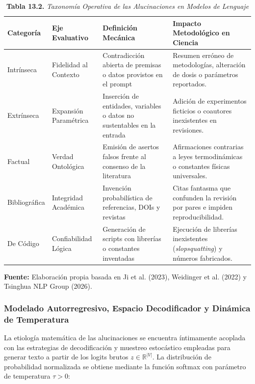 \begin{table}[htpb!]
\centering
\small
\renewcommand{\arraystretch}{1.4}
\begin{tcolorbox}[colback=white, colframe=unmsm_gold, arc=3pt, boxrule=0.8pt, top=0.2cm, bottom=0.2cm, left=0.3cm, right=0.3cm]
\caption*{\textbf{Tabla 13.2.} \textit{Taxonomía Operativa de las Alucinaciones en Modelos de Lenguaje}}
\begin{tabularx}{\textwidth}{l p{2.8cm} p{4.2cm} X}
\toprule
\textbf{Categoría} & \textbf{Eje Evaluativo} & \textbf{Definición Mecánica} & \textbf{Impacto Metodológico en Ciencia} \\
\midrule
Intrínseca & Fidelidad al Contexto & Contradicción abierta de premisas o datos provistos en el prompt & Resumen erróneo de metodologías, alteración de dosis o parámetros reportados. \\
Extrínseca & Expansión Paramétrica & Inserción de entidades, variables o datos no sustentables en la entrada & Adición de experimentos ficticios o coautores inexistentes en revisiones. \\
Factual & Verdad Ontológica & Emisión de asertos falsos frente al consenso de la literatura & Afirmaciones contrarias a leyes termodinámicas o constantes físicas universales. \\
Bibliográfica & Integridad Académica & Invención probabilística de referencias, DOIs y revistas & Citas fantasma que confunden la revisión por pares e impiden reproducibilidad. \\
De Código & Confiabilidad Lógica & Generación de scripts con librerías o constantes inventadas & Ejecución de librerías inexistentes (\textit{slopsquatting}) y números fabricados. \\
\bottomrule
\end{tabularx}
\vspace{0.15cm}
\raggedright
\scriptsize \textbf{Fuente:} Elaboración propia basada en Ji et al. (2023), Weidinger et al. (2022) y Tsinghua NLP Group (2026).
\end{tcolorbox}
\vspace{-0.2cm}
\end{table}

\subsubsection{Modelado Autorregresivo, Espacio Decodificador y Dinámica de Temperatura}

La etiología matemática de las alucinaciones se encuentra íntimamente acoplada con las estrategias de decodificación y muestreo estocástico empleadas para generar texto a partir de los logits brutos $z \in \mathbb{R}^{|V|}$. La distribución de probabilidad normalizada se obtiene mediante la función softmax con parámetro de temperatura $\tau > 0$:

